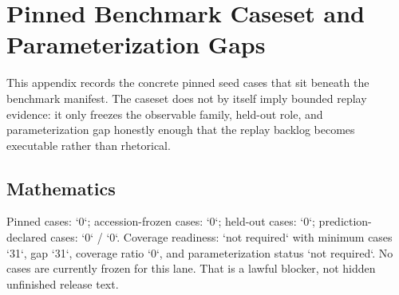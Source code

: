 \section{Pinned Benchmark Caseset and Parameterization Gaps}
\label{sec:oc-core-1-3-domain-benchmark-caseset}

This appendix records the concrete pinned seed cases that sit beneath the benchmark manifest. The caseset does not by itself imply bounded replay evidence: it only freezes the observable family, held-out role, and parameterization gap honestly enough that the replay backlog becomes executable rather than rhetorical.

\begingroup
\footnotesize
\RaggedRight
\sloppy

\subsection{Mathematics}
Pinned cases: `0`; accession-frozen cases: `0`; held-out cases: `0`; prediction-declared cases: `0` / `0`.
Coverage readiness: `not required` with minimum cases `31`, gap `31`, coverage ratio `0`, and parameterization status `not required`.
No cases are currently frozen for this lane. That is a lawful blocker, not hidden unfinished release text.

